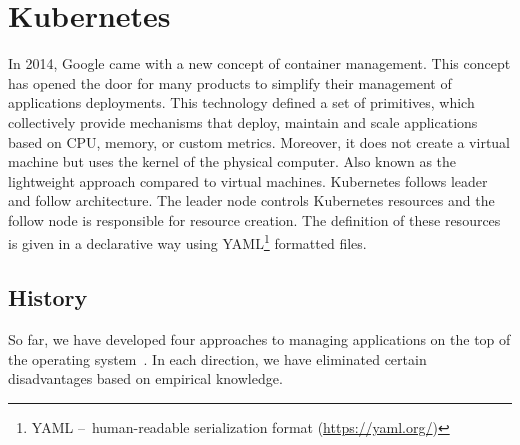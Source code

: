 \section{Kubernetes}
\label{01:sec:title}

In 2014, Google came with a new concept of container management.
This concept has opened the door for many products to simplify their management of applications deployments.
This technology defined a set of primitives, which collectively provide mechanisms that deploy, maintain and scale applications based on CPU, memory, or custom metrics.
Moreover, it does not create a virtual machine but uses the kernel of the physical computer.
Also known as the lightweight approach compared to virtual machines.
Kubernetes follows leader and follow architecture.
The leader node controls Kubernetes resources and the follow node is responsible for resource creation.
The definition of these resources is given in a declarative way using YAML\footnote{YAML
\---\ human-readable serialization format (\url{https://yaml.org/})} formatted files.

\subsection{History}
\label{fig:history}

So far, we have developed four approaches to managing applications on the top of the operating system~\cite{history}.
In each direction, we have eliminated certain disadvantages based on empirical knowledge.

